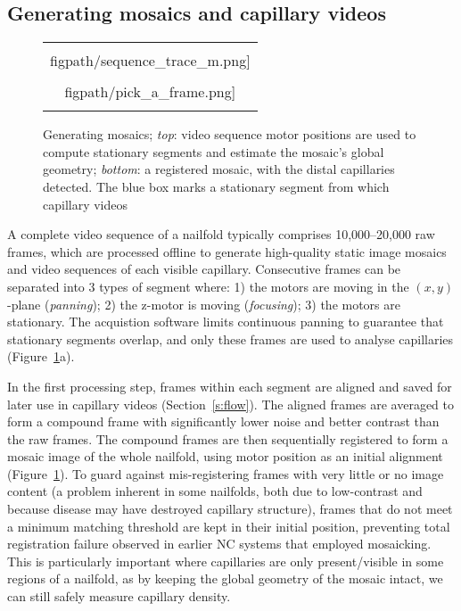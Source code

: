 \documentclass[runningheads,a4paper]{llncs}
\def\figpath{./figs}
\newcommand{\fref}[1]{Figure~\ref{#1}}
\newcommand{\sref}[1]{Section~\ref{#1}}
\def\figpath{./figs}
\def\eg{e.g.}
\begin{document}
\subsection{Generating mosaics and capillary videos}
%
\begin{figure}[t]
\centering
\begin{tabular}{@{}c@{}}
\texttt{[image: \\figpath/sequence\_trace\_m.png]}\\
\texttt{[image: \\figpath/pick\_a\_frame.png]}\\
\noalign{\smallskip}
\end{tabular}
%
\caption{Generating mosaics; \textit{top}: video sequence motor positions are used to compute stationary segments and estimate the mosaic's global geometry; \textit{bottom}: a registered mosaic, with the distal capillaries detected. The blue box marks a stationary segment from which capillary videos }
\label{f:capillaroscopy}
\end{figure}
%
A complete video sequence of a nailfold typically comprises 10,000--20,000 raw frames, which are processed offline to generate high-quality static image mosaics and video sequences of each visible capillary. Consecutive frames can be separated into 3 types of segment where: 1) the motors are moving in the $(x,y)$-plane (\textit{panning}); 2) the z-motor is moving (\textit{focusing}); 3) the motors are stationary. The acquistion software limits continuous panning to guarantee that stationary segments overlap, and only these frames are used to analyse capillaries (\fref{f:capillaroscopy}a). 

In the first processing step, frames within each segment are aligned and saved for later use in capillary videos (\sref{s:flow}). The aligned frames are averaged to form a compound frame with significantly lower noise and better contrast than the raw frames. The compound frames are then sequentially registered to form a mosaic image of the whole nailfold, using motor position as an initial alignment (\fref{f:capillaroscopy}). To guard against mis-registering frames with very little or no image content (a problem inherent in some nailfolds, both due to low-contrast and because disease may have destroyed capillary structure), frames that do not meet a minimum matching threshold are kept in their initial position, preventing total registration failure observed in earlier NC systems that employed mosaicking. This is particularly important where capillaries are only present/visible in some regions of a nailfold, as by keeping the global geometry of the mosaic intact, we can still safely measure capillary density.
%
\end{document}
